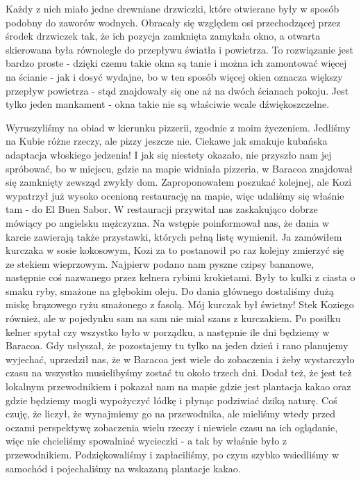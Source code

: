 Każdy z nich miało jedne drewniane drzwiczki, które otwierane były w sposób podobny do zaworów wodnych.
Obracały się względem osi przechodzącej przez środek drzwiczek tak, że ich pozycja zamknięta zamykała okno, a otwarta skierowana była równolegle do przepływu światła i powietrza.
To rozwiązanie jest bardzo proste - dzięki czemu takie okna są tanie i można ich zamontować więcej na ścianie - jak i dosyć wydajne, bo w ten sposób więcej okien oznacza większy przepływ powietrza - stąd znajdowały się one aż na dwóch ścianach pokoju.
Jest tylko jeden mankament - okna takie nie są właściwie wcale dźwiękoszczelne.
\par Wyruszyliśmy na obiad w kierunku pizzerii, zgodnie z moim życzeniem.
Jedliśmy na Kubie różne rzeczy, ale pizzy jeszcze nie.
Ciekawe jak smakuje kubańska adaptacja włoskiego jedzenia!
I jak się niestety okazało, nie przyszło nam jej spróbować, bo w miejscu, gdzie na mapie widniała pizzeria, w Baracoa znajdował się zamknięty zewsząd zwykły dom.
Zaproponowałem poszukać kolejnej, ale Kozi wypatrzył już wysoko ocenioną restaurację na mapie, więc udaliśmy się właśnie tam - do El Buen Sabor.
W restauracji przywitał nas zaskakująco dobrze mówiący po angielsku mężczyzna.
Na wstępie poinformował nas, że dania w karcie zawierają także przystawki, których pełną listę wymienił.
Ja zamówiłem kurczaka w sosie kokosowym, Kozi za to postanowił po raz kolejny zmierzyć się ze stekiem wieprzowym.
Najpierw podano nam pyszne czipsy bananowe, następnie coś nazwanego przez kelnera rybimi krokietami.
Były to kulki z ciasta o smaku ryby, smażone na głębokim oleju.
Do dania głównego dostaliśmy dużą miskę brązowego ryżu smażonego z fasolą.
Mój kurczak był świetny!
Stek Koziego również, ale w pojedynku sam na sam nie miał szans z kurczakiem.
Po posiłku kelner spytał czy wszystko było w porządku, a następnie ile dni będziemy w Baracoa.
Gdy usłyszał, że pozostajemy tu tylko na jeden dzień i rano planujemy wyjechać, uprzedził nas, że w Baracoa jest wiele do zobaczenia i żeby wystarczyło czasu na wszystko musielibyśmy zostać tu około trzech dni.
Dodał też, że jest też lokalnym przewodnikiem i pokazał nam na mapie gdzie jest plantacja kakao oraz gdzie będziemy mogli wypożyczyć łódkę i płynąc podziwiać dziką naturę.
Coś czuję, że liczył, że wynajmiemy go na przewodnika, ale mieliśmy wtedy przed oczami perspektywę zobaczenia wielu rzeczy i niewiele czasu na ich oglądanie, więc nie chcieliśmy spowalniać wycieczki - a tak by właśnie było z przewodnikiem.
Podziękowaliśmy i zapłaciliśmy, po czym szybko wsiedliśmy w samochód i pojechaliśmy na wskazaną plantacje kakao.
